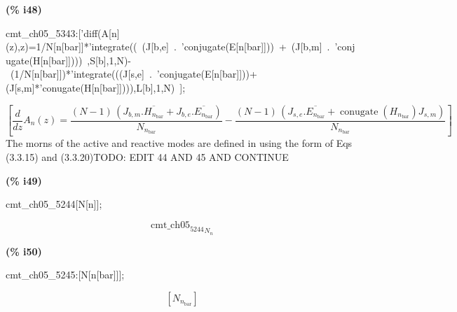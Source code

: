 \documentclass[fleqn]{article}
\begin{document}
\noindent
\begin{minipage}[t]{4.000000em}\color{red}\bfseries
(\% i48)	
\end{minipage}
\begin{minipage}[t]{\textwidth}\color{blue}
cmt\_ch05\_5343:['diff(A[n](z),z)=1/N[n[bar]]*'integrate((\ (J[b,e]\ .\ 'conjugate(E[n[bar]]))\ +\ (J[b,m]\ .\ 'conjugate(H[n[bar]])))\ ,S[b],1,N)-\ (1/N[n[bar]])*'integrate(((J[s,e]\ .\ 'conjugate(E[n[bar]]))+(J[s,m]*'conugate(H[n[bar]]))),L[b],1,N)\ ];
\end{minipage}
\[\displaystyle \tag{\% o48} 
\operatorname{[}\frac{d}{d z} {A_n}(z)=\frac{\left( N-1\right) \, \left( {J_{b,m}}\ensuremath{\mathrm{ . }}\overline{{H_{{n_{\ensuremath{\mathrm{bar}}}}}}}+{J_{b,e}}\ensuremath{\mathrm{ . }}\overline{{E_{{n_{\ensuremath{\mathrm{bar}}}}}}}\right) }{{N_{{n_{\ensuremath{\mathrm{bar}}}}}}}-
\frac{\left( N-1\right) \, \left( {J_{s,e}}\ensuremath{\mathrm{ . }}\overline{{E_{{n_{\ensuremath{\mathrm{bar}}}}}}}+\operatorname{conugate}\left( {H_{{n_{\ensuremath{\mathrm{bar}}}}}}\right)  {J_{s,m}}\right) }{{N_{{n_{\ensuremath{\mathrm{bar}}}}}}}\operatorname{]}\mbox{}
\]
The morns of the active and reactive modes are defined in using the form of Eqs (3.3.15) and (3.3.20)TODO: EDIT 44 AND 45 AND CONTINUE


\noindent
\begin{minipage}[t]{4.000000em}\color{red}\bfseries
(\% i49)	
\end{minipage}
\begin{minipage}[t]{\textwidth}\color{blue}
cmt\_ch05\_5244[N[n]];
\end{minipage}
\[\displaystyle \tag{\% o49} 
{{{{\ensuremath{\mathrm{cmt\_ ch05}}}_{\ensuremath{\mathrm{5244}}}}}_{{N_n}}}\mbox{}
\]


\noindent
\begin{minipage}[t]{4.000000em}\color{red}\bfseries
(\% i50)	
\end{minipage}
\begin{minipage}[t]{\textwidth}\color{blue}
cmt\_ch05\_5245:[N[n[bar]]];
\end{minipage}
\[\displaystyle \tag{\% o50} 
\left[ {N_{{n_{\ensuremath{\mathrm{bar}}}}}}\right] \mbox{}
\]
\end{document}
